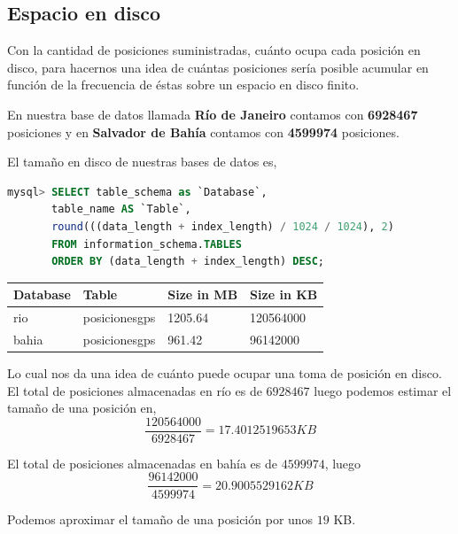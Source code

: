 \documentclass[a4paper, 12pt]{article}
\begin{document}
\pagebreak
\subsection{Espacio en disco}

Con la cantidad de posiciones suministradas, cu\'anto ocupa cada posici\'on en disco, para hacernos una idea de cu\'antas posiciones ser\'ia posible acumular en funci\'on de la frecuencia de \'estas sobre un espacio en disco finito.

En nuestra base de datos llamada \textbf{R\'io de Janeiro} contamos con \textbf{6928467} posiciones y en \textbf{Salvador de Bah\'ia} contamos con \textbf{4599974} posiciones.

El tama\~no en disco de nuestras bases de datos es,

\begin{lstlisting}[language=sql, basicstyle=\small, columns=fullflexible]
mysql> SELECT table_schema as `Database`, 
	   table_name AS `Table`,  
	   round(((data_length + index_length) / 1024 / 1024), 2) 
	   FROM information_schema.TABLES  
	   ORDER BY (data_length + index_length) DESC;

\end{lstlisting}

\begin{center}

	\begin{tabular}{| l | l | l | l |}
	\hline
	Database & Table & Size in MB & Size in KB \\
	\hline
	rio & posicionesgps & 1205.64 & 120564000 \\
	bahia & posicionesgps & 961.42 & 96142000 \\
	\hline
	\end{tabular}
\end{center}

Lo cual nos da una idea de cu\'anto puede ocupar una toma de posici\'on en disco.\\

El total de posiciones almacenadas en r\'io es de $6928467$ luego podemos estimar el tama\~no de una posici\'on en, \\
$$\frac{120564000}{6928467} = 17.4012519653 KB$$

El total de posiciones almacenadas en bah\'ia es de $4599974$, luego\\
$$\frac{96142000}{4599974} = 20.9005529162 KB$$

Podemos aproximar el tama\~no de una posici\'on por unos $19$ KB. \\
\end{document}
